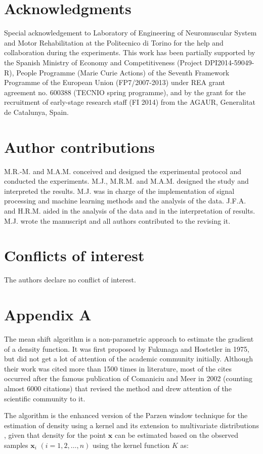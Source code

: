 \section{Acknowledgments}
Special acknowledgement to Laboratory of Engineering of Neuromuscular System and Motor Rehabilitation at the Politecnico di Torino for the help and collaboration during the experiments. This work has been partially supported by the Spanish Ministry of Economy and Competitiveness (Project DPI2014-59049-R), People Programme (Marie Curie Actions) of the Seventh Framework Programme of the European Union (FP7/2007-2013) under REA grant agreement no. 600388 (TECNIO spring programme), and by the grant for the recruitment of early-stage research staff (FI 2014) from the AGAUR, Generalitat de Catalunya, Spain.


\section{Author contributions}
M.R.-M. and M.A.M. conceived and designed the experimental protocol and conducted the experiments. M.J., M.R.M. and M.A.M. designed the study and interpreted the results. M.J. was in charge of the implementation of signal processing and machine learning methods and the analysis of the data. J.F.A. and H.R.M. aided in the analysis of the data and in the interpretation of results. M.J. wrote the manuscript and all authors contributed to the revising it.

\section{Conflicts of interest}
The authors declare no conflict of interest.
\clearpage

\section{Appendix A}
The mean shift algorithm is a non-parametric approach to estimate the gradient of a density function. It was first proposed by Fukunaga and Hostetler \citep{Fukunaga1975} in 1975, but did not get a lot of attention of the academic community initially. Although their work was cited more than 1500 times in literature, most of the cites occurred after the famous publication of Comaniciu and Meer \citep{Comaniciu2002} in 2002 (counting almost 6000 citations) that revised the method and drew attention of the scientific community to it.

The algorithm is the enhanced version of the Parzen window technique for the estimation of density using a kernel \citep{Parzen1962} and its extension to multivariate distributions \citep{Cacoullos1966}, given that density for the point $\textbf{x}$ can be estimated based on the observed samples $\textbf{x}_i$ $(i = 1,2,…,n)$ using the kernel function $K$ as:


